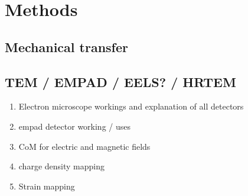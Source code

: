 \section{Methods}
\subsection{Mechanical transfer}
\subsection{TEM / EMPAD / EELS? / HRTEM}
\begin{enumerate}
    \item Electron microscope workings and explanation of all detectors
    \item empad detector working / uses
    \item CoM for electric and magnetic fields
    \item charge density mapping
    \item Strain mapping
\end{enumerate}

